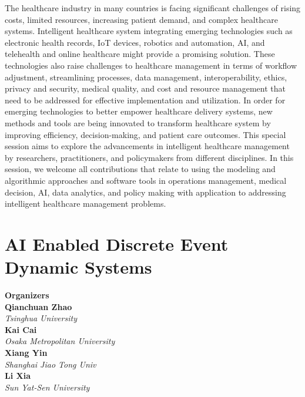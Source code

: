 The healthcare industry in many countries is facing significant challenges of rising costs, limited resources, increasing patient demand, and complex healthcare systems. Intelligent healthcare system integrating emerging technologies such as electronic health records, IoT devices, robotics and automation, AI, and telehealth and online healthcare might provide a promising solution. These technologies also raise challenges to healthcare management in terms of workflow adjustment, streamlining processes, data management, interoperability, ethics, privacy and security, medical quality, and cost and resource management that need to be addressed for effective implementation and utilization. In order for emerging technologies to better empower healthcare delivery systems, new methods and tools are being innovated to transform healthcare system by improving efficiency, decision-making, and patient care outcomes.  This special session aims to explore the advancements in intelligent healthcare management by researchers, practitioners, and policymakers from different disciplines. In this session, we welcome all contributions that relate to using the modeling and algorithmic approaches and software tools in operations management, medical decision, AI, data analytics, and policy making with application to addressing intelligent healthcare management problems. 

\section{AI Enabled Discrete Event Dynamic Systems}


\large \textbf{Organizers} \normalsize \vspace{2mm} \\
\textbf{Qianchuan  Zhao} \\ 
\textit{Tsinghua University} \vspace{{2mm}} \\
\textbf{Kai  Cai} \\ 
\textit{Osaka Metropolitan University} \vspace{{2mm}} \\
\textbf{Xiang  Yin} \\ 
\textit{Shanghai Jiao Tong Univ} \vspace{{2mm}} \\
\textbf{Li  Xia} \\ 
\textit{Sun Yat-Sen University}

